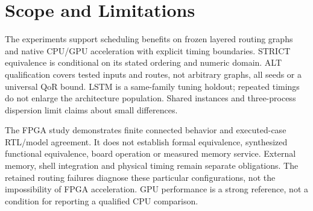 \section{Scope and Limitations}
The experiments support scheduling benefits on frozen layered routing graphs and native CPU/GPU acceleration with explicit timing boundaries. STRICT equivalence is conditional on its stated ordering and numeric domain. ALT qualification covers tested inputs and routes, not arbitrary graphs, all seeds or a universal QoR bound. LSTM is a same-family tuning holdout; repeated timings do not enlarge the architecture population. Shared instances and three-process dispersion limit claims about small differences.

The FPGA study demonstrates finite connected behavior and executed-case RTL/model agreement. It does not establish formal equivalence, synthesized functional equivalence, board operation or measured memory service. External memory, shell integration and physical timing remain separate obligations. The retained routing failures diagnose these particular configurations, not the impossibility of FPGA acceleration. GPU performance is a strong reference, not a condition for reporting a qualified CPU comparison.
